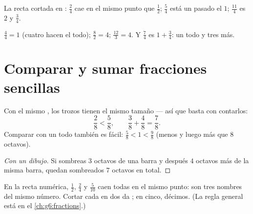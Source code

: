 \begin{omfigure}

{\small La recta cortada en : $\frac24$ cae en el mismo punto
que $\frac12$; $\frac54$ está un  pasado el $1$; $\frac{11}{4}$ es
$2$ y $\frac34$.}
\end{omfigure}

\begin{example}\label{ex:g4:fractions:whole}
$\frac44 = 1$ (cuatro  hacen el todo); $\frac82 = 4$;
$\frac{12}{3} = 4$. Y $\frac74$ es $1 + \frac34$: un todo y
tres  más.
\end{example}

\section{Comparar y sumar fracciones sencillas}

\begin{proposition}\label{prop:g4:fractions:compare}
Con el mismo , los trozos tienen el mismo tamaño --- así que basta
con contarlos:
\[
\frac{2}{8} < \frac{5}{8},
\qquad
\frac{3}{8} + \frac{4}{8} = \frac{7}{8}.
\]
Comparar con un todo también es fácil: $\frac{5}{8} < 1 < \frac{9}{8}$
(menos y luego más que $8$ octavos).
\end{proposition}

\begin{proof}[Con un dibujo]
Si sombreas $3$ octavos de una barra y después $4$ octavos más de la misma barra,
quedan sombreados $7$ octavos en total.
\end{proof}

\begin{example}\label{ex:g4:fractions:equal}
En la recta numérica, $\frac12$, $\frac24$ y $\frac{5}{10}$ caen todas
en el mismo punto: son tres nombres del mismo número. Cortar
cada  en dos da ; en cinco, décimos. (La regla general
está en el \cref{ch:g6:fractions}.)
\end{example}

